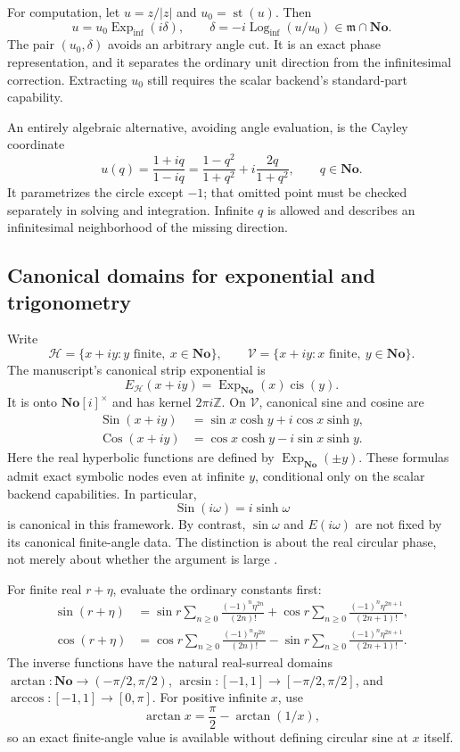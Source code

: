 \documentclass[11pt,letterpaper]{article}
\theoremstyle{definition}
\newcommand{\No}{\mathbf{No}}
\newcommand{\SC}{\mathbf{No}[i]}
\newcommand{\Z}{\mathbb Z}
\newcommand{\mm}{\mathfrak m}
\newcommand{\st}{\operatorname{st}}
\newcommand{\cis}{\operatorname{cis}}
\newcommand{\Sin}{\operatorname{Sin}}
\newcommand{\Cos}{\operatorname{Cos}}
\newcommand{\ExpNo}{\operatorname{Exp}_{\No}}
\newcommand{\Expi}{\operatorname{Exp}_{\mathrm{inf}}}
\newcommand{\Logi}{\operatorname{Log}_{\mathrm{inf}}}
\numberwithin{equation}{section}
\begin{document}
For computation, let $u=z/|z|$ and $u_0=\st(u)$. Then
\begin{equation}\label{eq:anglesplit}
 u=u_0\Expi(i\delta),\qquad
 \delta=-i\Logi(u/u_0)\in\mm\cap\No.
\end{equation}
The pair $(u_0,\delta)$ avoids an arbitrary angle cut. It is an exact phase representation, and it separates the ordinary unit direction from the infinitesimal correction. Extracting $u_0$ still requires the scalar backend's standard-part capability.

An entirely algebraic alternative, avoiding angle evaluation, is the Cayley coordinate
\begin{equation}\label{eq:cayley}
 u(q)=\frac{1+iq}{1-iq}
      =\frac{1-q^2}{1+q^2}+i\frac{2q}{1+q^2},\qquad q\in\No.
\end{equation}
It parametrizes the circle except $-1$; that omitted point must be checked separately in solving and integration. Infinite $q$ is allowed and describes an infinitesimal neighborhood of the missing direction.

\subsection{Canonical domains for exponential and trigonometry}
Write
\[
 \mathscr H=\{x+iy:y\text{ finite},\ x\in\No\},\qquad
 \mathscr V=\{x+iy:x\text{ finite},\ y\in\No\}.
\]
The manuscript's canonical strip exponential is
\begin{equation}\label{eq:stripexp}
 E_{\mathscr H}(x+iy)=\ExpNo(x)\cis(y).
\end{equation}
It is onto $\SC^\times$ and has kernel $2\pi i\Z$. On $\mathscr V$, canonical sine and cosine are
\begin{align}
 \Sin(x+iy)&=\sin x\cosh y+i\cos x\sinh y,\\
 \Cos(x+iy)&=\cos x\cosh y-i\sin x\sinh y.
 \label{eq:striptrig}
\end{align}
Here the real hyperbolic functions are defined by $\ExpNo(\pm y)$. These formulas admit exact symbolic nodes even at infinite $y$, conditional only on the scalar backend capabilities. In particular,
\[
 \Sin(i\omega)=i\sinh\omega
\]
is canonical in this framework. By contrast, $\sin\omega$ and $E(i\omega)$ are not fixed by its canonical finite-angle data. The distinction is about the real circular phase, not merely about whether the argument is large \cite[\S10]{SourceTrig}.

For finite real $r+\eta$, evaluate the ordinary constants first:
\begin{align}
 \sin(r+\eta)&=\sin r\sum_{n\ge0}\frac{(-1)^n\eta^{2n}}{(2n)!}
       +\cos r\sum_{n\ge0}\frac{(-1)^n\eta^{2n+1}}{(2n+1)!},\\
 \cos(r+\eta)&=\cos r\sum_{n\ge0}\frac{(-1)^n\eta^{2n}}{(2n)!}
       -\sin r\sum_{n\ge0}\frac{(-1)^n\eta^{2n+1}}{(2n+1)!}.
\end{align}
The inverse functions have the natural real-surreal domains $\arctan:\No\to(-\pi/2,\pi/2)$, $\arcsin:[-1,1]\to[-\pi/2,\pi/2]$, and $\arccos:[-1,1]\to[0,\pi]$. For positive infinite $x$, use
\[
 \arctan x=\frac\pi2-\arctan(1/x),
\]
so an exact finite-angle value is available without defining circular sine at $x$ itself.
\end{document}

